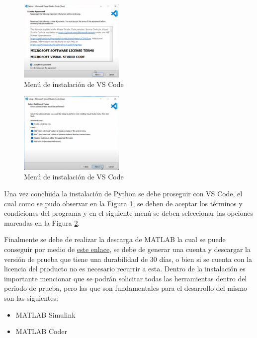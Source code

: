 \begin{figure}[h!]
    \centering
    \includegraphics[width=0.45\textwidth]{fig/especifico_2/Ambiente_matlab/instalacion_vs_code.pdf}
    \caption{Menú de instalación de VS Code}
    \label{fig:menu_vscode}
\end{figure}


\begin{figure}[h!]
    \centering
    \includegraphics[width=0.45\textwidth]{fig/especifico_2/Ambiente_matlab/opciones_adicionales_vs_code.pdf}
    \caption{Menú de instalación de VS Code}
    \label{fig:menu_vscode_adicionales}
\end{figure}

Una vez concluida la instalación de Python se debe proseguir con VS Code, el cual como se pudo observar en la Figura \ref{fig:menu_vscode}, se deben de aceptar los términos y condiciones del programa y en el siguiente menú se deben seleccionar las opciones marcadas en la Figura \ref{fig:menu_vscode_adicionales}.

Finalmente se debe de realizar la descarga de MATLAB la cual se puede conseguir por medio de \href{https://matlab.mathworks.com/}{este enlace}, se debe de generar una cuenta y descargar la versión de prueba que tiene una durabilidad de 30 días, o bien si se cuenta con la licencia del producto no es necesario recurrir a esta. Dentro de la instalación es importante mencionar que se podrán solicitar todas las herramientas dentro del periodo de prueba, pero las que son fundamentales para el desarrollo del mismo son las siguientes:

\begin{itemize}
    \item MATLAB Simulink
    \item MATLAB Coder
\end{itemize}

